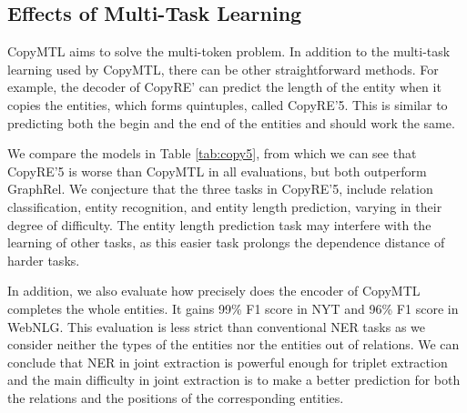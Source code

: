 \documentclass[letterpaper]{article} \usepackage{aaai20}  \usepackage{times}  \usepackage{helvet} \usepackage{courier}  \usepackage[hyphens]{url}  \usepackage{graphicx}
\begin{document}
  
      




  
  
  
  
  
  \subsection{Effects of Multi-Task Learning}
  \label{sec:quintuple}
  
      CopyMTL aims to solve the multi-token problem. 
In addition to the multi-task learning used by CopyMTL, there can be other straightforward methods. 
      For example, 
the decoder of CopyRE' can predict the length of the entity when it copies the entities, which forms quintuples, called CopyRE'5. This is similar to predicting both the begin and the end of the entities and should work the same.
  
      We compare the models in Table \ref{tab:copy5}, from which we can see that CopyRE'5 is worse than CopyMTL in all evaluations, but both outperform GraphRel. 
      We conjecture that the three tasks in CopyRE'5, include relation classification, entity recognition, and entity length prediction, varying in their degree of difficulty.
      The entity length prediction task may interfere with the learning of other tasks, as this easier task prolongs the dependence distance of harder tasks. 


In addition, we also evaluate how precisely does the encoder of CopyMTL completes the whole entities. It gains 99\% F1 score in NYT and 96\% F1 score in WebNLG. This evaluation is less strict than conventional NER tasks as we consider neither the types of the entities nor the entities out of relations. We can conclude that NER in joint extraction is powerful enough for triplet extraction and the main difficulty in joint extraction is to make a better prediction for both the relations and the positions of the corresponding entities.
\end{document}
